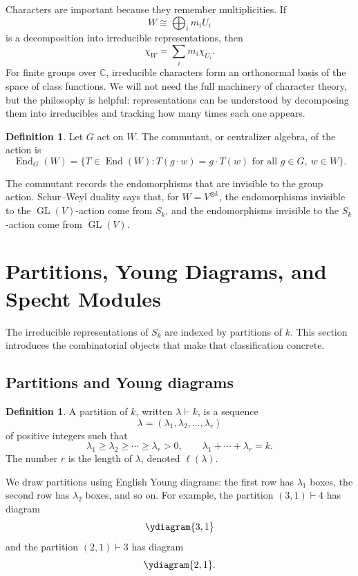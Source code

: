 \documentclass[12pt,a4paper]{article}
\theoremstyle{definition}
\newtheorem{definition}[theorem]{Definition}
\theoremstyle{remark}
\newcommand{\C}{\mathbb{C}}
\newcommand{\GL}{\operatorname{GL}}
\newcommand{\End}{\operatorname{End}}
\begin{document}
Characters are important because they remember multiplicities.  If
\[
W\cong \bigoplus_i m_i U_i
\]
is a decomposition into irreducible representations, then
\[
\chi_W=\sum_i m_i\chi_{U_i}.
\]
For finite groups over \(\C\), irreducible characters form an orthonormal
basis of the space of class functions.  We will not need the full machinery
of character theory, but the philosophy is helpful: representations can be
understood by decomposing them into irreducibles and tracking how many times
each one appears.

\begin{definition}
Let \(G\) act on \(W\).  The commutant, or centralizer algebra, of the action
is
\[
\End_G(W)=\{T\in \End(W):T(g\cdot w)=g\cdot T(w)
\text{ for all }g\in G,\ w\in W\}.
\]
\end{definition}

The commutant records the endomorphisms that are invisible to the group
action.  Schur--Weyl duality says that, for \(W=V^{\otimes k}\), the
endomorphisms invisible to the \(\GL(V)\)-action come from \(S_k\), and the
endomorphisms invisible to the \(S_k\)-action come from \(\GL(V)\).

\section{Partitions, Young Diagrams, and Specht Modules}

The irreducible representations of \(S_k\) are indexed by partitions of
\(k\).  This section introduces the combinatorial objects that make that
classification concrete.

\subsection{Partitions and Young diagrams}

\begin{definition}
A partition of \(k\), written \(\lambda\vdash k\), is a sequence
\[
\lambda=(\lambda_1,\lambda_2,\dots,\lambda_r)
\]
of positive integers such that
\[
\lambda_1\ge \lambda_2\ge \cdots\ge \lambda_r>0,
\qquad
\lambda_1+\cdots+\lambda_r=k.
\]
The number \(r\) is the length of \(\lambda\), denoted \(\ell(\lambda)\).
\end{definition}

We draw partitions using English Young diagrams: the first row has
\(\lambda_1\) boxes, the second row has \(\lambda_2\) boxes, and so on.  For
example, the partition \((3,1)\vdash 4\) has diagram
\[
\ydiagram{3,1}
\]
and the partition \((2,1)\vdash 3\) has diagram
\[
\ydiagram{2,1}.
\]
\end{document}
